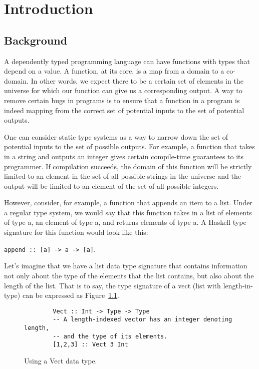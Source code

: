 
\chapter{Introduction}

\section{Background}
A dependently typed programming language can have functions with types that
depend on a value. A function, at its core, is a map from a domain to a
co-domain. In other words, we expect there to be a certain set of elements in
the universe for which our function can give us a corresponding output. A way to
remove certain bugs in programs is to ensure that a function in a program is
indeed mapping from the correct set of potential inputs to the set of potential
outputs. 

One can consider static type systems as a way to narrow down the set of
potential inputs to the set of possible outputs. For example, a function that
takes in a string and outputs an integer gives certain compile-time guarantees
to its programmer. If compilation succeeds, the domain of this function will be
strictly limited to an element in the set of all possible strings in the
universe and the output will be limited to an element of the set of all possible
integers. 

However, consider, for example, a function that appends an item to a list. Under
a regular type system, we would say that this function takes in a list of
elements of type a, an element of type a, and returns elements of type a. A
Haskell type signature for this function would look like this: 

\texttt{append :: [a] -> a -> [a]}. 


Let's imagine that we have a list data type signature that contains information
not only about the type of the elements that the list contains, but also about
the length of the list. That is to say, the type signature of a vect (list with
length-in-type) can be expressed as Figure~\ref{vect}.

\begin{figure}
    \caption{Using a Vect data type.}
    \label{vect}
    \begin{lstlisting}
        Vect :: Int -> Type -> Type 
        -- A length-indexed vector has an integer denoting length, 
        -- and the type of its elements. 
        [1,2,3] :: Vect 3 Int
    \end{lstlisting}
\end{figure} 

